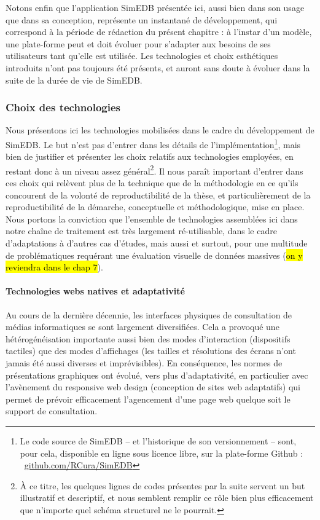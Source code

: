 Notons enfin que l'application SimEDB présentée ici, aussi bien dans son usage que dans sa conception, représente un instantané de développement, qui correspond à la période de rédaction du présent chapitre :
à l'instar d'un modèle, une plate-forme peut et doit évoluer pour s'adapter aux besoins de ses utilisateurs tant qu'elle est utilisée.
Les technologies et choix esthétiques introduits n'ont pas toujours été présents, et auront sans doute à évoluer dans la suite de la \og durée de vie\fg{} de SimEDB.

\subsubsection{Choix des technologies}

Nous présentons ici les technologies mobilisées dans le cadre du développement de SimEDB.
Le but n'est pas d'entrer dans les détails de l'implémentation\footnote{
Le code source de SimEDB -- et l'historique de son versionnement -- sont, pour cela, disponible en ligne sous licence libre, sur la plate-forme Github : 
\faGithub~\href{https://github.com/RCura/SimEDB}{github.com/RCura/SimEDB}
}, mais bien de justifier et présenter les choix relatifs aux technologies employées, en restant donc à un niveau assez général\footnote{
À ce titre, les quelques lignes de codes présentes par la suite servent un but illustratif et descriptif, et nous semblent remplir ce rôle bien plus efficacement que n'importe quel schéma structurel ne le pourrait.
}.
Il nous paraît important d'entrer dans ces choix qui relèvent plus de la technique que de la méthodologie en ce qu'ils concourent de la volonté de reproductibilité de la thèse, et particulièrement de la reproductibilité de la démarche, conceptuelle et méthodologique, mise en place.
Nous portons la conviction que l'ensemble de technologies assemblées ici dans notre \og chaîne de traitement\fg{} est très largement ré-utilisable, dans le cadre d'adaptations à d'autres cas d'études, mais aussi et surtout, pour une multitude de problématiques requérant une évaluation visuelle de données massives (\hl{on y reviendra dans le chap 7}).

\paragraph*{Technologies webs \og natives\fg{}  et adaptativité}

Au cours de la dernière décennie, les interfaces physiques de consultation de médias informatiques se sont largement diversifiées.
Cela a provoqué une hétérogénéisation importante aussi bien des modes d'interaction (dispositifs \og tactiles\fg{}) que des modes d'affichages (les tailles et résolutions des écrans n'ont jamais été aussi diverses et imprévisibles).
En conséquence, les normes de présentations graphiques ont évolué, vers plus d'\fg{}adaptativité\fg{}, en particulier avec l'avènement du \og responsive web design\fg{} (\og conception de sites web adaptatifs\fg{}) qui permet de prévoir efficacement l'agencement d'une page web quelque soit le support de consultation.

